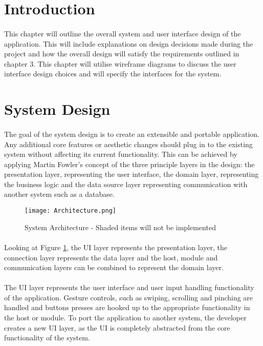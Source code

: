 \section{Introduction}
	\paragraph{}{
	This chapter will outline the overall system and user interface design of the application. This will include explanations on design decisions made during the project and how the overall design will satisfy the requirements outlined in chapter 3. This chapter will utilise wireframe diagrams to discuss the user interface design choices and will specify the interfaces for the system.
	}

\section{System Design}
	\paragraph{}{
	The goal of the system design is to create an extensible and portable application. Any additional core features or aesthetic changes should plug in to the existing system without affecting its current functionality. This can be achieved by applying Martin Fowler's concept of the three principle layers in the design: the presentation layer, representing the user interface, the domain layer, representing the business logic and the data source layer representing communication with another system such as a database. \cite{Fowler}
	}
	\begin{figure}[h]
		\begin{center}
			\texttt{[image: Architecture.png]}
			\caption{System Architecture - Shaded items will not be implemented}
			\label{fig:Architecture}
		\end{center}
	\end{figure}
	\paragraph{}{
	Looking at Figure \ref{fig:Architecture}, the UI layer represents the presentation layer, the connection layer represents the data layer and the host, module and communication layers can be combined to represent the domain layer.
	}	
	
	\paragraph{}{
	The UI layer represents the user interface and user input handling functionality of the application. Gesture controls, such as swiping, scrolling and pinching are handled and buttons presses are hooked up to the appropriate functionality in the host or module. To port the application to another system, the developer creates a new UI layer, as the UI is completely abstracted from the core functionality of the system.
	}	
	
